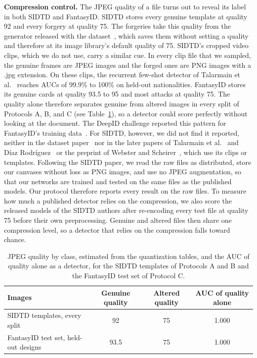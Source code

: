 \documentclass[12pt,a4paper]{article}
\newif\ifshowguidance
\newcommand{\todo}[1]{\ifshowguidance\leavevmode{\color{gray}\itshape [#1]}\fi}
\begin{document}
\textbf{Compression control.} The JPEG quality of a file turns out to reveal its label in both SIDTD and FantasyID. SIDTD stores every genuine template at quality 92 and every forgery at quality 75. The forgeries take this quality from the generator released with the dataset~\cite{boned2024sidtd}, which saves them without setting a quality and therefore at its image library's default quality of 75. SIDTD's cropped video clips, which we do not use, carry a similar cue. In every clip file that we sampled, the genuine frames are JPEG images and the forged ones are PNG images with a .jpg extension. On these clips, the recurrent few-shot detector of Talarmain et al.~\cite{talarmain2024fewshot} reaches AUCs of 99.9\% to 100\% on held-out nationalities. FantasyID stores its genuine cards at quality 93.5 to 95 and most attacks at quality 75. The quality alone therefore separates genuine from altered images in every split of Protocols A, B, and C (see Table~\ref{tab:jpeg}), so a detector could score perfectly without looking at the document. The DeepID challenge reported this pattern for FantasyID's training data~\cite{korshunov2025deepid}. For SIDTD, however, we did not find it reported, neither in the dataset paper~\cite{boned2024sidtd} nor in the later papers of Talarmain et al.~\cite{talarmain2024fewshot} and Díaz Rodríguez~\cite{diazrodriguez2026docverify} or the preprint of Webster and Scheirer~\cite{webster2026saliency}, which use its clips or templates. Following the SIDTD paper, we read the raw files as distributed, store our canvases without loss as PNG images, and use no JPEG augmentation, so that our networks are trained and tested on the same files as the published models. Our protocol therefore reports every result on the raw files. To measure how much a published detector relies on the compression, we also score the released models of the SIDTD authors after re-encoding every test file at quality 75 before their own preprocessing. Genuine and altered files then share one compression level, so a detector that relies on the compression falls toward chance. \todo{Following commit e6b986d (11 Oct), our own networks are reported on the raw files only. The 30 Protocol A runs also have results with the query and reference canvases re-encoded at quality 75 (AUC 0.571 for the control, 0.928 for the median, and 0.896 for the blank specimen), which can be restored if wanted.}

\begin{table}[htbp]
\centering\small
\caption{JPEG quality by class, estimated from the quantization tables, and the AUC of quality alone as a detector, for the SIDTD templates of Protocols A and B and the FantasyID test set of Protocol C.}
\label{tab:jpeg}
\begin{tabular}{lccc}
\toprule
Images & Genuine quality & Altered quality & AUC of quality alone \\
\midrule
SIDTD templates, every split & 92 & 75 & 1.000 \\
FantasyID test set, held-out designs & 93.5 & 75 & 1.000 \\
\bottomrule
\end{tabular}
\end{table}
\end{document}
